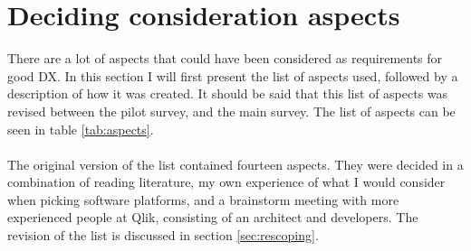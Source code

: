 \documentclass{cslthse-msc}
\begin{document}
    \section{Deciding consideration aspects}
    There are a lot of aspects that could have been considered as requirements for
    good DX. In this section I will first present the list of aspects used, followed by a description of how it was created. It should be said that this list of aspects was revised between the pilot survey, and the main survey. The list of aspects can be seen in table \ref{tab:aspects}.\\ \\
    The original version of the list contained fourteen aspects. They were decided in a combination
    of reading literature, my own experience of what I would consider when
    picking software platforms, and a brainstorm meeting with more experienced
    people at Qlik, consisting of an architect and developers. The revision of the list is discussed in section \ref{sec:rescoping}.
\end{document}

